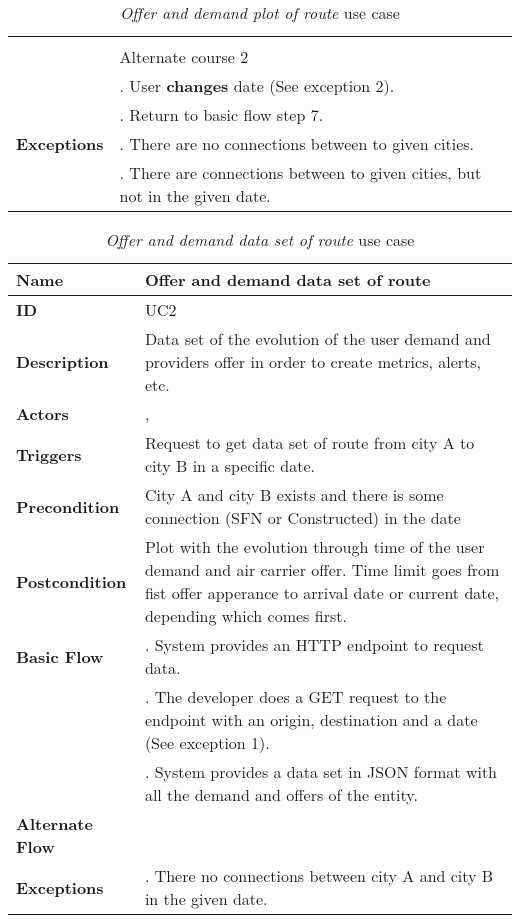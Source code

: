 \begin{table}
\begin{tabular}{|>{\raggedright\arraybackslash}p{3.2cm}|>{\raggedright\arraybackslash}p{10cm}|}
                                & \\
                                & Alternate course 2 \\
                                & 1. User \textbf{changes} date (See exception 2). \\
                                & 2. Return to basic flow step 7. \\
\hline
\textbf{Exceptions}             & 1. There are no connections between to given cities. \\
                                & 2. There are connections between to given cities, but not in the given date. \\
\hline
\end{tabular}
\caption{\textit{Offer and demand plot of route} use case}
\label{UC1}
\end{table}

\begin{table}
\begin{tabular}{|>{\raggedright\arraybackslash}p{3.2cm}|>{\raggedright\arraybackslash}p{10cm}|}
\hline
\textbf{Name}                   & Offer and demand data set of route \\
\hline
\textbf{ID}                     & UC2 \\
\hline
\textbf{Description}            & Data set of the evolution of the user demand and providers offer in order to create metrics, alerts, etc. \\
\hline
\textbf{Actors}                 & \nameref{mas}, \nameref{dlr} \\
\hline
\textbf{Triggers}               & Request to get data set of route from city A to city B in a specific date. \\
\hline
\textbf{Precondition}           & City A and city B exists and there is some connection (SFN or Constructed) in the date \\
\hline
\textbf{Postcondition}          & Plot with the evolution through time of the user demand and air carrier offer. Time limit goes from fist offer apperance to arrival date or current date, depending which comes first. \\
\hline
\textbf{Basic Flow}             & 1. System provides an HTTP endpoint to request data. \\
                                & 2. The developer does a GET request to the endpoint with an origin, destination and a date (See exception 1). \\
                                & 3. System provides a data set in JSON format with all the demand and offers of the entity. \\
\hline
\textbf{Alternate Flow}         & \\
\hline
\textbf{Exceptions}             & 1. There no connections between city A and city B in the given date. \\
\hline
\end{tabular}
\caption{\textit{Offer and demand data set of route} use case}
\label{UC2}
\end{table}

